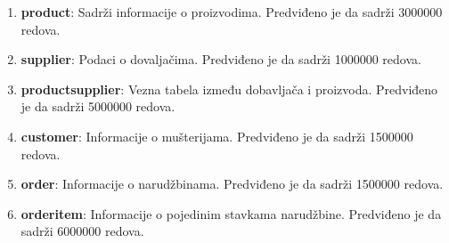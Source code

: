 \documentclass[12pt,oneside]{memoir}
\begin{document}
\begin{enumerate}
\item[\textbullet] \textbf{product}: {
	Sadrži informacije o proizvodima. Predviđeno je da sadrži 3000000 redova.
}
\item[\textbullet] \textbf{supplier}:{
	Podaci o dovaljačima. Predviđeno je da sadrži 1000000 redova.
}
\item[\textbullet] \textbf{productsupplier}:{
	Vezna tabela između dobavljača i proizvoda. Predviđeno je da sadrži 5000000 redova.
}
\item[\textbullet] \textbf{customer}:{
	Informacije o mušterijama. Predviđeno je da sadrži 1500000 redova.
}
\item[\textbullet] \textbf{order}:{
	Informacije o narudžbinama. Predviđeno je da sadrži 1500000 redova.
}
\item[\textbullet] \textbf{orderitem}:{
	Informacije o pojedinim stavkama narudžbine. Predviđeno je da sadrži 6000000 redova.
}

\end{enumerate}


\end{document}
